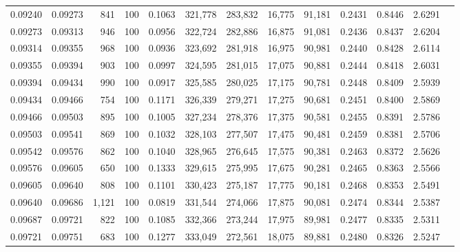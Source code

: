 \begin{tabular}{rrrrrrrrrrrrr}
0.09240 & 0.09273 &   841 & 100 &                                     0.1063 & 321,778 & 283,832 &  16,775 &  91,181 & 0.2431 & 0.8446 & 2.6291 \\
0.09273 & 0.09313 &   946 & 100 &                                     0.0956 & 322,724 & 282,886 &  16,875 &  91,081 & 0.2436 & 0.8437 & 2.6204 \\
0.09314 & 0.09355 &   968 & 100 &                                     0.0936 & 323,692 & 281,918 &  16,975 &  90,981 & 0.2440 & 0.8428 & 2.6114 \\
0.09355 & 0.09394 &   903 & 100 &                                     0.0997 & 324,595 & 281,015 &  17,075 &  90,881 & 0.2444 & 0.8418 & 2.6031 \\
0.09394 & 0.09434 &   990 & 100 &                                     0.0917 & 325,585 & 280,025 &  17,175 &  90,781 & 0.2448 & 0.8409 & 2.5939 \\
0.09434 & 0.09466 &   754 & 100 &                                     0.1171 & 326,339 & 279,271 &  17,275 &  90,681 & 0.2451 & 0.8400 & 2.5869 \\
0.09466 & 0.09503 &   895 & 100 &                                     0.1005 & 327,234 & 278,376 &  17,375 &  90,581 & 0.2455 & 0.8391 & 2.5786 \\
0.09503 & 0.09541 &   869 & 100 &                                     0.1032 & 328,103 & 277,507 &  17,475 &  90,481 & 0.2459 & 0.8381 & 2.5706 \\
0.09542 & 0.09576 &   862 & 100 &                                     0.1040 & 328,965 & 276,645 &  17,575 &  90,381 & 0.2463 & 0.8372 & 2.5626 \\
0.09576 & 0.09605 &   650 & 100 &                                     0.1333 & 329,615 & 275,995 &  17,675 &  90,281 & 0.2465 & 0.8363 & 2.5566 \\
0.09605 & 0.09640 &   808 & 100 &                                     0.1101 & 330,423 & 275,187 &  17,775 &  90,181 & 0.2468 & 0.8353 & 2.5491 \\
0.09640 & 0.09686 & 1,121 & 100 &                                     0.0819 & 331,544 & 274,066 &  17,875 &  90,081 & 0.2474 & 0.8344 & 2.5387 \\
0.09687 & 0.09721 &   822 & 100 &                                     0.1085 & 332,366 & 273,244 &  17,975 &  89,981 & 0.2477 & 0.8335 & 2.5311 \\
0.09721 & 0.09751 &   683 & 100 &                                     0.1277 & 333,049 & 272,561 &  18,075 &  89,881 & 0.2480 & 0.8326 & 2.5247 \\

\end{tabular}
